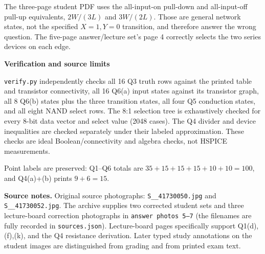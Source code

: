 \documentclass[10pt]{article}
\begin{document}
The three-page student PDF uses the all-input-on pull-down and all-input-off pull-up equivalents, $2W/(3L)$ and $3W/(2L)$. Those are general network states, not the specified $X=1,Y=0$ transition, and therefore answer the wrong question. The five-page answer/lecture set's page 4 correctly selects the two series devices on each edge.

\textbf{Verification and source limits}

\texttt{verify.py} independently checks all 16 Q3 truth rows against the printed table and transistor connectivity, all 16 Q6(a) input states against its transistor graph, all 8 Q6(b) states plus the three transition states, all four Q5 conduction states, and all eight NAND select rows. The 8:1 selection tree is exhaustively checked for every 8-bit data vector and select value (2048 cases). The Q4 divider and device inequalities are checked separately under their labeled approximation. These checks are ideal Boolean/connectivity and algebra checks, not HSPICE measurements.

Point labels are preserved: Q1--Q6 totals are $35+15+15+15+10+10=100$, and Q4(a)+(b) prints $9+6=15$.

\textbf{Source notes.} Original source photographs: \texttt{S\_\_41730050.jpg} and \texttt{S\_\_41730052.jpg}. The archive supplies two corrected student sets and three lecture-board correction photographs in \texttt{answer photos 5--7} (the filenames are fully recorded in \texttt{sources.json}). Lecture-board pages specifically support Q1(d),(f),(k), and the Q4 resistance derivation. Later typed study annotations on the student images are distinguished from grading and from printed exam text.
\end{document}
